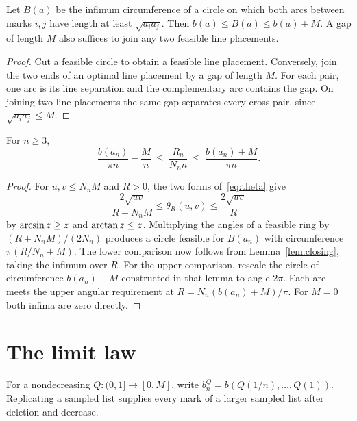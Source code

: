 \begin{lemma}\label{lem:closing}
Let $B(a)$ be the infimum circumference of a circle on which both arcs
between marks $i,j$ have length at least $\sqrt{a_i a_j}$. Then
$b(a)\le B(a)\le b(a)+M$. A gap of length $M$ also suffices to join
any two feasible line placements.
\end{lemma}
\begin{proof}
Cut a feasible circle to obtain a feasible line placement. Conversely,
join the two ends of an optimal line placement by a gap of length $M$.
For each pair, one arc is its line separation and the complementary
arc contains the gap. On joining two line placements the same gap
separates every cross pair, since $\sqrt{a_i a_j}\le M$.
\end{proof}

\begin{lemma}\label{lem:profile-squeeze}
For $n\ge3$,
\begin{equation}\label{eq:profile-squeeze}
 \frac{b(a_n)}{\pi n}-\frac{M}{n}
 \ \le\ \frac{R_n}{N_n n}\ \le\ \frac{b(a_n)+M}{\pi n}.
\end{equation}
\end{lemma}
\begin{proof}
For $u,v\le N_n M$ and $R>0$, the two forms of~\eqref{eq:theta} give
\[
 \frac{2\sqrt{uv}}{R+N_nM}\le\theta_R(u,v)\le\frac{2\sqrt{uv}}{R}
\]
by $\operatorname{arcsin} z\ge z$ and $\operatorname{arctan} z\le z$. Multiplying the angles of a
feasible ring by $(R+N_nM)/(2N_n)$ produces a circle feasible for
$B(a_n)$ with circumference $\pi(R/N_n+M)$. The lower comparison now
follows from Lemma~\ref{lem:closing}, taking the infimum over $R$.
For the upper comparison, rescale the circle of circumference $b(a_n)+M$
constructed in that lemma to angle $2\pi$. Each arc meets the upper
angular requirement at $R=N_n(b(a_n)+M)/\pi$. For $M=0$ both infima
are zero directly.
\end{proof}

\section{The limit law}\label{sec:profiles}

For a nondecreasing $Q:(0,1]\to[0,M]$, write
$b_n^Q=b(Q(1/n),\ldots,Q(1))$. Replicating a sampled list supplies every mark of a larger sampled
list after deletion and decrease.

